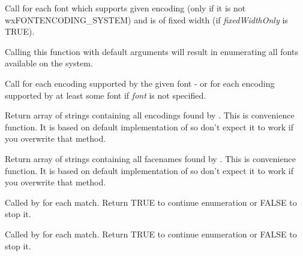 
\label{wxfontenumeratorenumeratefacenames}


Call  for each font which
supports given encoding (only if it is not wxFONTENCODING\_SYSTEM) and is of
fixed width (if {\it fixedWidthOnly} is TRUE).

Calling this function with default arguments will result in enumerating all
fonts available on the system.

\label{wxfontenumeratorenumerateencodings}


Call  for each
encoding supported by the given font - or for each encoding supported by at
least some font if {\it font} is not specified.


\label{wxfontenumeratorgetencodings}


Return array of strings containing all encodings found by 
. This is convenience function. It is 
based on default implementation of  so don't expect
it to work if you overwrite that method.

\label{wxfontenumeratorgetfacenames}


Return array of strings containing all facenames found by 
. This is convenience function. It is 
based on default implementation of  so don't expect
it to work if you overwrite that method.


\label{wxfontenumeratoronfacename}


Called by  for
each match. Return TRUE to continue enumeration or FALSE to stop it.

\label{wxfontenumeratoronfontencoding}


Called by  for
each match. Return TRUE to continue enumeration or FALSE to stop it.

